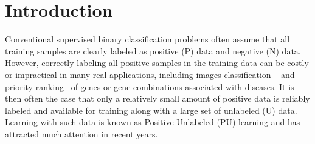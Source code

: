 \documentclass[sigconf]{acmart}
\begin{document}


\maketitle

\section{Introduction}

Conventional supervised binary classification problems often assume that all training samples are clearly labeled as positive (P) data and negative (N) data. However, correctly labeling all positive samples in the training data can be costly or impractical in many real applications, including images classification ~\cite{geurts2011learning} and priority ranking~\cite{mordelet2011prodige,mordelet2014bagging} of genes or gene combinations associated with diseases. It is then often the case that only a relatively small amount of positive data is reliably labeled and available for training along with a large set of unlabeled (U) data. Learning with such data is known as Positive-Unlabeled (PU) learning and has attracted much attention in recent years. 

\end{document}
